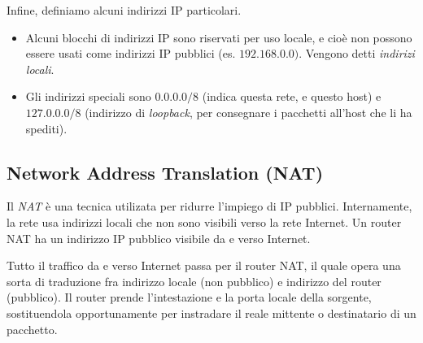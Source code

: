         \vspace{3mm}
        
        Infine, definiamo alcuni indirizzi IP particolari.
    
        \begin{itemize}
            \item
                Alcuni blocchi di indirizzi IP sono riservati per uso locale, e cioè non possono essere usati come indirizzi IP pubblici (es. $192.168.0.0)$. Vengono detti \textit{indirizi locali}.
                
            \item
                Gli indirizzi speciali sono $0.0.0.0/8$ (indica questa rete, e questo host) e $127.0.0.0/8$ (indirizzo di \textit{loopback}, per consegnare i pacchetti all'host che li ha spediti).
        \end{itemize}
        
    \subsection{Network Address Translation (NAT)}
    
        Il \textit{NAT} è una tecnica utilizata per ridurre l'impiego di IP pubblici. Internamente, la rete usa indirizzi locali che non sono visibili verso la rete Internet. Un router NAT ha un indirizzo IP pubblico visibile da e verso Internet. 
        
        Tutto il traffico da e verso Internet passa per il router NAT, il quale opera una sorta di traduzione fra indirizzo locale (non pubblico) e indirizzo del router (pubblico). Il router prende l'intestazione e la porta locale della sorgente, sostituendola opportunamente per instradare il reale mittente o destinatario di un pacchetto.
        
        